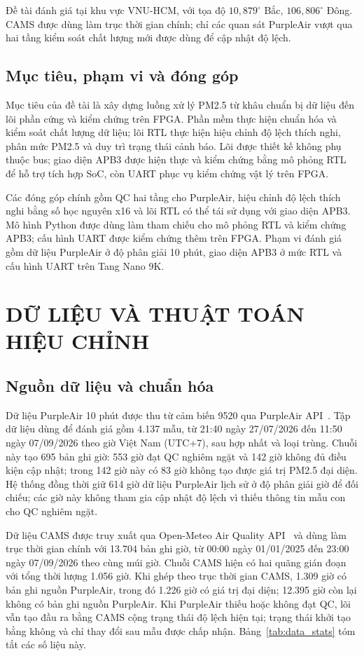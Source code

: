 \documentclass[a4paper,oneside,openany]{extreport}
\begin{document}
Đề tài đánh giá tại khu vực VNU-HCM, với tọa độ $10{,}879^\circ$ Bắc, $106{,}806^\circ$ Đông. CAMS được dùng làm trục thời gian chính; chỉ các quan sát PurpleAir vượt qua hai tầng kiểm soát chất lượng mới được dùng để cập nhật độ lệch.

\section{Mục tiêu, phạm vi và đóng góp}
Mục tiêu của đề tài là xây dựng luồng xử lý PM2.5 từ khâu chuẩn bị dữ liệu đến lõi phần cứng và kiểm chứng trên FPGA. Phần mềm thực hiện chuẩn hóa và kiểm soát chất lượng dữ liệu; lõi RTL thực hiện hiệu chỉnh độ lệch thích nghi, phân mức PM2.5 và duy trì trạng thái cảnh báo. Lõi được thiết kế không phụ thuộc bus; giao diện APB3 được hiện thực và kiểm chứng bằng mô phỏng RTL để hỗ trợ tích hợp SoC, còn UART phục vụ kiểm chứng vật lý trên FPGA.

Các đóng góp chính gồm QC hai tầng cho PurpleAir, hiệu chỉnh độ lệch thích nghi bằng số học nguyên x16 và lõi RTL có thể tái sử dụng với giao diện APB3. Mô hình Python được dùng làm tham chiếu cho mô phỏng RTL và kiểm chứng APB3; cấu hình UART được kiểm chứng thêm trên FPGA. Phạm vi đánh giá gồm dữ liệu PurpleAir ở độ phân giải 10 phút, giao diện APB3 ở mức RTL và cấu hình UART trên Tang Nano 9K.

\chapter{DỮ LIỆU VÀ THUẬT TOÁN HIỆU CHỈNH}

\section{Nguồn dữ liệu và chuẩn hóa}
Dữ liệu PurpleAir 10 phút được thu từ cảm biến 9520 qua PurpleAir API~\cite{purpleair_api}. Tập dữ liệu dùng để đánh giá gồm 4.137 mẫu, từ 21:40 ngày 27/07/2026 đến 11:50 ngày 07/09/2026 theo giờ Việt Nam (UTC+7), sau hợp nhất và loại trùng. Chuỗi này tạo 695 bản ghi giờ: 553 giờ đạt QC nghiêm ngặt và 142 giờ không đủ điều kiện cập nhật; trong 142 giờ này có 83 giờ không tạo được giá trị PM2.5 đại diện. Hệ thống đồng thời giữ 614 giờ dữ liệu PurpleAir lịch sử ở độ phân giải giờ để đối chiếu; các giờ này không tham gia cập nhật độ lệch vì thiếu thông tin mẫu con cho QC nghiêm ngặt.

Dữ liệu CAMS được truy xuất qua Open-Meteo Air Quality API~\cite{openmeteo_air} và dùng làm trục thời gian chính với 13.704 bản ghi giờ, từ 00:00 ngày 01/01/2025 đến 23:00 ngày 07/09/2026 theo cùng múi giờ. Chuỗi CAMS hiện có hai quãng gián đoạn với tổng thời lượng 1.056 giờ. Khi ghép theo trục thời gian CAMS, 1.309 giờ có bản ghi nguồn PurpleAir, trong đó 1.226 giờ có giá trị đại diện; 12.395 giờ còn lại không có bản ghi nguồn PurpleAir. Khi PurpleAir thiếu hoặc không đạt QC, lõi vẫn tạo đầu ra bằng CAMS cộng trạng thái độ lệch hiện tại; trạng thái khởi tạo bằng không và chỉ thay đổi sau mẫu được chấp nhận. Bảng~\ref{tab:data_stats} tóm tắt các số liệu này.
\end{document}
